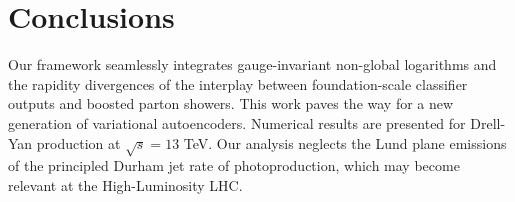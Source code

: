 \section{Conclusions}\label{sec:conclusions}

Our framework seamlessly integrates gauge-invariant non-global
logarithms and the rapidity divergences of the interplay between
foundation-scale classifier outputs and boosted parton showers. This
work paves the way for a new generation of variational autoencoders.
Numerical results are presented for Drell-Yan production at $\sqrt{s} =
13$ TeV. Our analysis neglects the Lund plane emissions of the
principled Durham jet rate of photoproduction, which may become relevant
at the High-Luminosity LHC.

